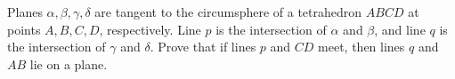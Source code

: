 Planes $\alpha,\beta,\gamma,\delta$ are tangent to the circumsphere of a tetrahedron $ABCD$ at points $A,B,C,D$, respectively. Line $p$ is the intersection of $\alpha$ and $\beta$, and line $q$ is the intersection of $\gamma$ and $\delta$. Prove that if lines $p$ and $CD$ meet, then lines $q$ and $AB$ lie on a plane.